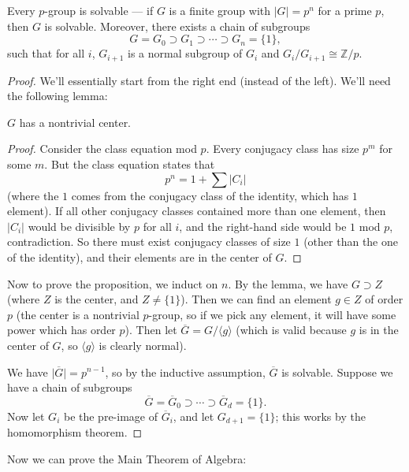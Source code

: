 \begin{proposition}
    Every $p$-group is solvable --- if $G$ is a finite group with $\lvert G\rvert = p^n$ for a prime $p$, then $G$ is solvable. Moreover, there exists a chain of subgroups \[G = G_0 \supset G_1 \supset \cdots \supset G_n = \{1\},\] such that for all $i$, $G_{i + 1}$ is a normal subgroup of $G_i$ and $G_i/G_{i + 1} \cong \mathbb{Z}/p$.  
\end{proposition}

\begin{proof}
    We'll essentially start from the right end (instead of the left). We'll need the following lemma:

    \begin{lemma}
        $G$ has a nontrivial center. 
    \end{lemma}

    \begin{proof}
        Consider the class equation mod $p$. Every conjugacy class has size $p^m$ for some $m$. But the class equation states that \[p^n = 1 + \sum \lvert C_i \rvert\] (where the $1$ comes from the conjugacy class of the identity, which has $1$ element). If all other conjugacy classes contained more than one element, then $\lvert C_i \rvert$ would be divisible by $p$ for all $i$, and the right-hand side would be $1$ mod $p$, contradiction. So there must exist conjugacy classes of size $1$ (other than the one of the identity), and their elements are in the center of $G$. 
    \end{proof}
    
    Now to prove the proposition, we induct on $n$. By the lemma, we have $G \supset Z$ (where $Z$ is the center, and $Z \neq \{1\}$). Then we can find an element $g \in Z$ of order $p$ (the center is a nontrivial $p$-group, so if we pick any element, it will have some power which has order $p$). Then let $\overline{G} = G/\langle g\rangle$ (which is valid because $g$ is in the center of $G$, so $\langle g \rangle$ is clearly normal). 
    
    We have $\lvert \overline{G} \rvert = p^{n - 1}$, so by the inductive assumption, $\overline{G}$ is solvable. Suppose we have a chain of subgroups \[\overline{G} = \overline{G}_0 \supset \cdots \supset \overline{G}_d = \{1\}.\] Now let $G_i$ be the pre-image of $\overline{G}_i$, and let $G_{d + 1} = \{1\}$; this works by the homomorphism theorem. 
\end{proof}

Now we can prove the Main Theorem of Algebra:

